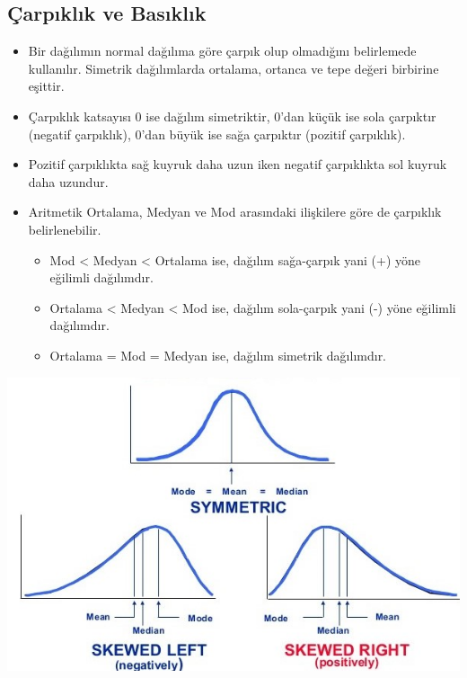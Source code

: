 \documentclass[
  letterpaper,
  DIV=11,
  numbers=noendperiod]{scrreprt}
\begin{document}
\subsection*{Çarpıklık ve
Basıklık}\label{uxe7arpux131klux131k-ve-basux131klux131k}

\begin{itemize}
\item
  Bir dağılımın normal dağılıma göre çarpık olup olmadığını belirlemede
  kullanılır. Simetrik dağılımlarda ortalama, ortanca ve tepe değeri
  birbirine eşittir.
\item
  Çarpıklık katsayısı 0 ise dağılım simetriktir, 0'dan küçük ise sola
  çarpıktır (negatif çarpıklık), 0'dan büyük ise sağa çarpıktır (pozitif
  çarpıklık).
\item
  Pozitif çarpıklıkta sağ kuyruk daha uzun iken negatif çarpıklıkta sol
  kuyruk daha uzundur.
\item
  Aritmetik Ortalama, Medyan ve Mod arasındaki ilişkilere göre de
  çarpıklık belirlenebilir.

  \begin{itemize}
  \item
    Mod \textless{} Medyan \textless{} Ortalama ise, dağılım sağa-çarpık
    yani (+) yöne eğilimli dağılımdır.
  \item
    Ortalama \textless{} Medyan \textless{} Mod ise, dağılım sola-çarpık
    yani (-) yöne eğilimli dağılımdır.
  \item
    Ortalama = Mod = Medyan ise, dağılım simetrik dağılımdır.
  \end{itemize}
\end{itemize}

\begin{center}
\includegraphics{images/mean_median_mode.png}
\end{center}
\end{document}

